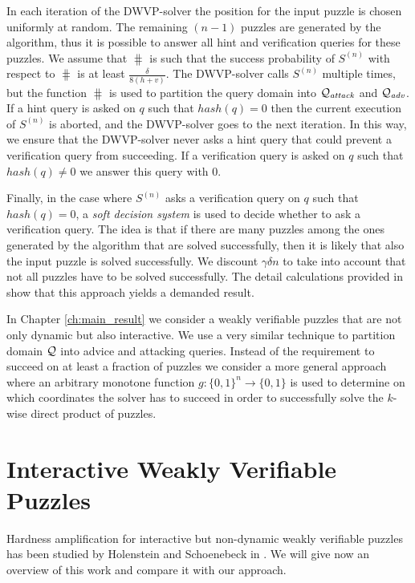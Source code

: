 In each iteration of the DWVP-solver the position for the input puzzle is chosen uniformly at random.
The remaining $(n-1)$ puzzles are generated by the algorithm, thus it is possible to answer
all hint and verification queries for these puzzles.
We assume that $\hash$ is such that the success probability of $S^{(n)}$ with respect to $\hash$ is at least $\frac{\delta}{8(h+v)}$.
The DWVP-solver calls $S^{(n)}$ multiple times, but the function $\hash$ is used
to partition the query domain into $\mathcal{Q}_{\mathit{attack}}$ and $\mathcal{Q}_{\mathit{adv}}$.
If a hint query is asked on $q$ such that $hash(q) = 0$ then the current execution of $S^{(n)}$
is aborted, and the DWVP-solver goes to the next iteration.
In this way, we ensure that the DWVP-solver never asks a hint query that could prevent a verification query from succeeding.
If a verification query is asked on $q$ such that $hash(q) \neq 0$ we answer this query with $0$.

Finally, in the case where $S^{(n)}$ asks a verification query on $q$ such that $hash(q) = 0$,
a \textit{soft decision system} is used to decide whether to ask a verification query.
The idea is that if there are many puzzles among the ones generated by the algorithm that are solved successfully,
then it is likely that also the input puzzle is solved successfully.
We discount $\gamma\delta n$ to take into account that not all puzzles have to be solved successfully.
The detail calculations provided in \cite{Dodis:2009:SAI:1530441.1530450} show that this approach
yields a demanded result.

In Chapter \ref{ch:main_result} we consider a weakly verifiable puzzles that are not only dynamic but also interactive.
We use a very similar technique to partition domain $\mathcal{Q}$ into advice and attacking queries.
Instead of the requirement to succeed on at least a fraction of puzzles we consider a more general approach where
an arbitrary monotone function $g : \{0,1\}^{n} \rightarrow \{0,1\}$ is used to
determine on which coordinates the solver has to succeed in order to successfully solve the $k$-wise direct product of puzzles.

\section{Interactive Weakly Verifiable Puzzles}
\label{section:iwvp}
Hardness amplification for interactive but non-dynamic weakly verifiable puzzles
has been studied by Holenstein and Schoenebeck in \cite{DBLP:journals/corr/abs-1002-3534}.
We will give now an overview of this work and compare it with our approach.

